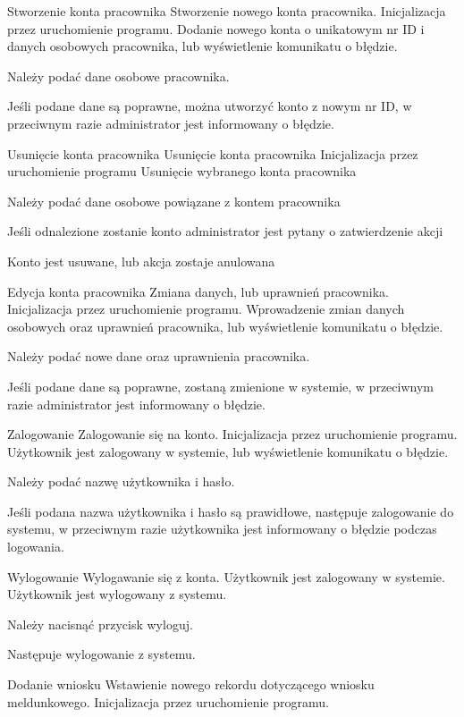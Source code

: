 \documentclass[12pt]{article}
\begin{document}
\scenario
    {Stworzenie konta pracownika}
    {Stworzenie nowego konta pracownika.}
    {Inicjalizacja przez uruchomienie programu.}
    {Dodanie nowego konta o unikatowym nr ID i danych osobowych pracownika, lub wyświetlenie komunikatu o błędzie.}
    {
        \item Należy podać dane osobowe pracownika.
        \item Jeśli podane dane są poprawne, można utworzyć konto z nowym nr ID, w przeciwnym razie administrator jest informowany o błędzie.
    }
\scenario
    {Usunięcie konta pracownika}
    {Usunięcie konta pracownika}
    {Inicjalizacja przez uruchomienie programu}
    {Usunięcie wybranego konta pracownika}
    {
        \item Należy podać dane osobowe powiązane z kontem pracownika
        \item Jeśli odnalezione zostanie konto administrator jest pytany o zatwierdzenie akcji
        \item Konto jest usuwane, lub akcja zostaje anulowana
    }
\scenario
    {Edycja konta pracownika}
    {Zmiana danych, lub uprawnień pracownika.}
    {Inicjalizacja przez uruchomienie programu.}
    {Wprowadzenie zmian danych osobowych oraz uprawnień pracownika, lub wyświetlenie komunikatu o błędzie.}
    {
        \item Należy podać nowe dane oraz uprawnienia pracownika.
        \item Jeśli podane dane są poprawne, zostaną zmienione w systemie, w przeciwnym razie administrator jest informowany o błędzie.
    }
\scenario
    {Zalogowanie}
    {Zalogowanie się na konto.}
    {Inicjalizacja przez uruchomienie programu.}
    {Użytkownik jest zalogowany w systemie, lub wyświetlenie komunikatu o błędzie.}
    {
        \item Należy podać nazwę użytkownika i hasło.
        \item Jeśli podana nazwa użytkownika i hasło są prawidłowe, następuje zalogowanie do systemu, w przeciwnym razie użytkownika jest informowany o błędzie podczas logowania.
    }
\scenario
    {Wylogowanie}
    {Wylogawanie się z konta.}
    {Użytkownik jest zalogowany w systemie. }
    {Użytkownik jest wylogowany z systemu.}
    {
        \item Należy nacisnąć przycisk wyloguj.
        \item Następuje wylogowanie z systemu.
    }
\scenario
    {Dodanie wniosku}
    {Wstawienie nowego rekordu dotyczącego wniosku meldunkowego.}
    {Inicjalizacja przez uruchomienie programu.}
\end{document}
